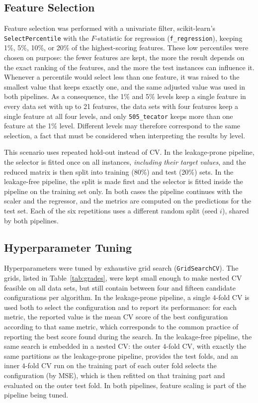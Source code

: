 \subsection{Feature Selection}
\label{sec:met-selecao}

Feature selection was performed with a univariate filter, scikit-learn's
\texttt{SelectPercentile} with the $F$-statistic for regression
(\texttt{f\_regression}), keeping 1\%, 5\%, 10\%, or 20\% of the
highest-scoring features. These low percentiles were chosen on purpose: the fewer features are kept, the
more the result depends on the exact ranking of the features, and the more the
test instances can influence it.
Whenever a percentile would select less than one feature, it was raised to the
smallest value that keeps exactly one, and the same adjusted value was used in
both pipelines. As a consequence, the 1\% and 5\% levels keep a single feature in every
data set with up to 21 features, the data sets with four features keep a single
feature at all four levels, and only \texttt{505\_tecator} keeps more than one
feature at the 1\% level. Different levels may therefore correspond to the same
selection, a fact that must be considered when interpreting the results by level.

This scenario uses repeated hold-out instead of CV. In the leakage-prone
pipeline, the selector is fitted once on all instances, \emph{including their
target values}, and the reduced matrix is then split into training (80\%) and
test (20\%) sets. In the leakage-free pipeline, the split is made first and the
selector is fitted inside the pipeline on the training set only. In both cases
the pipeline continues with the scaler and the regressor, and the metrics are
computed on the predictions for the test set. Each of the six repetitions uses a
different random split (seed $i$), shared by both pipelines.

\subsection{Hyperparameter Tuning}
\label{sec:met-tuning}

Hyperparameters were tuned by exhaustive grid search (\texttt{GridSearchCV}).
The grids, listed in Table~\ref{tab:grades}, were kept small enough to make nested CV feasible on all data sets, but still
contain between four and fifteen
candidate configurations per algorithm. In the leakage-prone pipeline, a single
$4$-fold CV is used both to select the configuration and to report its
performance: for each metric, the reported value is the mean CV score of the
best configuration according to that same metric, which corresponds to the
common practice of reporting the best score found during the search. In the
leakage-free pipeline, the same search is embedded in a nested CV: the outer
$4$-fold CV, with exactly the same partitions as the leakage-prone pipeline,
provides the test folds, and an inner $4$-fold CV run on the training part of
each outer fold selects the configuration (by MSE), which is then refitted on
that training part and evaluated on the outer test fold. In both pipelines,
feature scaling is part of the pipeline being tuned.

